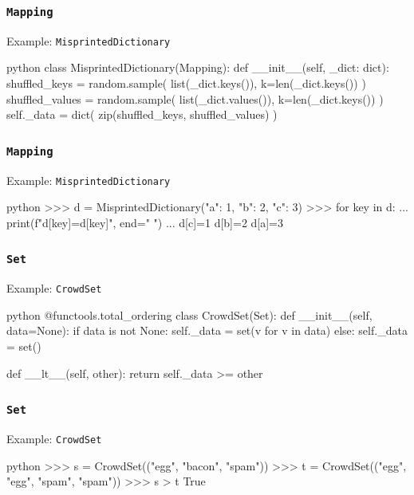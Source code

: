 \documentclass[aspectratio=169,dvipdfmx,12pt,notheorems]{beamer}
\theoremstyle{definition}
\begin{document}
\begin{frame}[fragile]\frametitle{\texttt{Mapping}}

\begin{exampleblock}{Example: \texttt{MisprintedDictionary}}
\begin{pygments}{python}
class MisprintedDictionary(Mapping):
    def __init__(self, _dict: dict):
        shuffled_keys = random.sample(
            list(_dict.keys()), k=len(_dict.keys())
        )
        shuffled_values = random.sample(
            list(_dict.values()), k=len(_dict.keys())
        )
        self._data = dict(
            zip(shuffled_keys, shuffled_values)
        )
\end{pygments}
\end{exampleblock}

\end{frame}

\begin{frame}[fragile]\frametitle{\texttt{Mapping}}

\begin{exampleblock}{Example: \texttt{MisprintedDictionary}}
\begin{pygments}{python}
>>> d = MisprintedDictionary({"a": 1, "b": 2, "c": 3})
>>> for key in d:
...     print(f"d[{key}]={d[key]}", end=" ")
...
d[c]=1 d[b]=2 d[a]=3
\end{pygments}
\end{exampleblock}

\end{frame}

\begin{frame}[fragile]\frametitle{\texttt{Set}}

\begin{exampleblock}{Example: \texttt{CrowdSet}}
\begin{pygments}{python}
@functools.total_ordering
class CrowdSet(Set):
    def __init__(self, data=None):
        if data is not None:
            self._data = set(v for v in data)
        else:
            self._data = set()

    def __lt__(self, other):
        return self._data >= other
\end{pygments}
\end{exampleblock}

\end{frame}

\begin{frame}[fragile]\frametitle{\texttt{Set}}

\begin{exampleblock}{Example: \texttt{CrowdSet}}
\begin{pygments}{python}
>>> s = CrowdSet(("egg", "bacon", "spam"))
>>> t = CrowdSet(("egg", "egg", "spam", "spam"))
>>> s > t
True
\end{pygments}
\end{exampleblock}

\end{frame}
\end{document}
